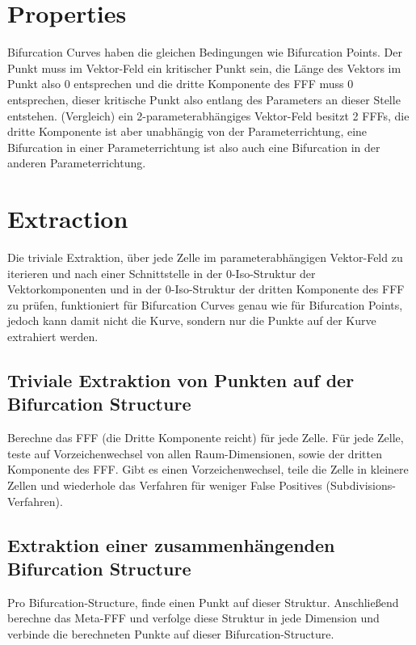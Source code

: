 \documentclass[11pt]{article}
\begin{document}
\section{Properties}
Bifurcation Curves haben die gleichen Bedingungen wie Bifurcation Points. Der Punkt muss im Vektor-Feld ein kritischer Punkt sein, die Länge des Vektors im Punkt also 0 entsprechen und die dritte Komponente des FFF muss 0 entsprechen, dieser kritische Punkt also entlang des Parameters an dieser Stelle entstehen.
(Vergleich) ein 2-parameterabhängiges Vektor-Feld besitzt 2 FFFs, die dritte Komponente ist aber unabhängig von der Parameterrichtung, eine Bifurcation in einer Parameterrichtung ist also auch eine Bifurcation in der anderen Parameterrichtung.

\section{Extraction}
Die triviale Extraktion, über jede Zelle im parameterabhängigen Vektor-Feld zu iterieren und nach einer Schnittstelle in der 0-Iso-Struktur der Vektorkomponenten und in der 0-Iso-Struktur der dritten Komponente des FFF zu prüfen, funktioniert für Bifurcation Curves genau wie für Bifurcation Points, jedoch kann damit nicht die Kurve, sondern nur die Punkte auf der Kurve extrahiert werden.

\subsection{Triviale Extraktion von Punkten auf der Bifurcation Structure}
Berechne das FFF (die Dritte Komponente reicht) für jede Zelle.
Für jede Zelle, teste auf Vorzeichenwechsel von allen Raum-Dimensionen, sowie der dritten Komponente des FFF. Gibt es einen Vorzeichenwechsel, teile die Zelle in kleinere Zellen und wiederhole das Verfahren für weniger False Positives (Subdivisions-Verfahren).

\subsection{Extraktion einer zusammenhängenden Bifurcation Structure}
Pro Bifurcation-Structure, finde einen Punkt auf dieser Struktur. Anschließend berechne das Meta-FFF und verfolge diese Struktur in jede Dimension und verbinde die berechneten Punkte auf dieser Bifurcation-Structure.
\end{document}
